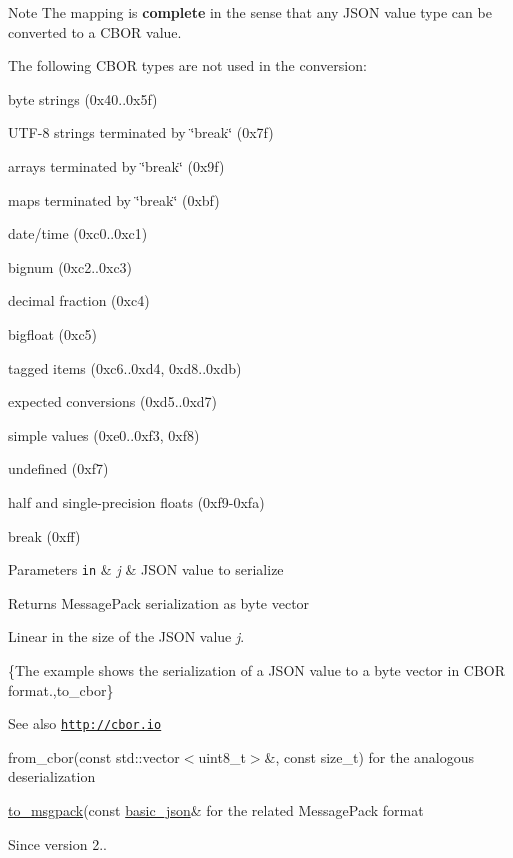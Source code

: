 \begin{DoxyNote}{Note}
The mapping is {\bfseries complete} in the sense that any J\+S\+ON value type can be converted to a C\+B\+OR value.

The following C\+B\+OR types are not used in the conversion\+:
\begin{DoxyItemize}
\item byte strings (0x40..0x5f)
\item U\+T\+F-\/8 strings terminated by \char`\"{}break\char`\"{} (0x7f)
\item arrays terminated by \char`\"{}break\char`\"{} (0x9f)
\item maps terminated by \char`\"{}break\char`\"{} (0xbf)
\item date/time (0xc0..0xc1)
\item bignum (0xc2..0xc3)
\item decimal fraction (0xc4)
\item bigfloat (0xc5)
\item tagged items (0xc6..0xd4, 0xd8..0xdb)
\item expected conversions (0xd5..0xd7)
\item simple values (0xe0..0xf3, 0xf8)
\item undefined (0xf7)
\item half and single-\/precision floats (0xf9-\/0xfa)
\item break (0xff)
\end{DoxyItemize}
\end{DoxyNote}

\begin{DoxyParams}[1]{Parameters}
\mbox{\tt in}  & {\em j} & J\+S\+ON value to serialize \\
\hline
\end{DoxyParams}
\begin{DoxyReturn}{Returns}
Message\+Pack serialization as byte vector
\end{DoxyReturn}
Linear in the size of the J\+S\+ON value {\itshape j}.

\{The example shows the serialization of a J\+S\+ON value to a byte vector in C\+B\+OR format.,to\+\_\+cbor\}

\begin{DoxySeeAlso}{See also}
\href{http://cbor.io}{\tt http\+://cbor.\+io} 

from\+\_\+cbor(const std\+::vector$<$uint8\+\_\+t$>$\&, const size\+\_\+t) for the analogous deserialization 

\hyperlink{classnlohmann_1_1basic__json_a09ca1dc273d226afe0ca83a9d7438d9c}{to\+\_\+msgpack}(const \hyperlink{classnlohmann_1_1basic__json}{basic\+\_\+json}\& for the related Message\+Pack format
\end{DoxySeeAlso}
\begin{DoxySince}{Since}
version 2.. 
\end{DoxySince}


